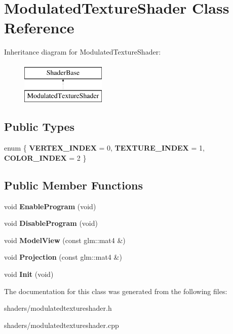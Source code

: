 \hypertarget{classModulatedTextureShader}{\section{\-Modulated\-Texture\-Shader \-Class \-Reference}
\label{classModulatedTextureShader}
}
\-Inheritance diagram for \-Modulated\-Texture\-Shader\-:\begin{figure}[H]
\begin{center}
\leavevmode
\includegraphics[height=2.000000cm]{classModulatedTextureShader}
\end{center}
\end{figure}
\subsection*{\-Public \-Types}
\begin{DoxyCompactItemize}
\item 
enum \{ {\bfseries \-V\-E\-R\-T\-E\-X\-\_\-\-I\-N\-D\-E\-X} =  0, 
{\bfseries \-T\-E\-X\-T\-U\-R\-E\-\_\-\-I\-N\-D\-E\-X} =  1, 
{\bfseries \-C\-O\-L\-O\-R\-\_\-\-I\-N\-D\-E\-X} =  2
 \}
\end{DoxyCompactItemize}
\subsection*{\-Public \-Member \-Functions}
\begin{DoxyCompactItemize}
\item 
\hypertarget{classModulatedTextureShader_a2c28abc3169683267ea6edb812fb86f1}{void {\bfseries \-Enable\-Program} (void)}\label{classModulatedTextureShader_a2c28abc3169683267ea6edb812fb86f1}

\item 
\hypertarget{classModulatedTextureShader_a4013bd45b8dfeb92c422b461aaea55fd}{void {\bfseries \-Disable\-Program} (void)}\label{classModulatedTextureShader_a4013bd45b8dfeb92c422b461aaea55fd}

\item 
\hypertarget{classModulatedTextureShader_ac31c77280c385429860dde8898bf95ea}{void {\bfseries \-Model\-View} (const glm\-::mat4 \&)}\label{classModulatedTextureShader_ac31c77280c385429860dde8898bf95ea}

\item 
\hypertarget{classModulatedTextureShader_a315d7c9ca628120da31f1b418e952888}{void {\bfseries \-Projection} (const glm\-::mat4 \&)}\label{classModulatedTextureShader_a315d7c9ca628120da31f1b418e952888}

\item 
\hypertarget{classModulatedTextureShader_a1f450015891452223c0e7d9da5c79925}{void {\bfseries \-Init} (void)}\label{classModulatedTextureShader_a1f450015891452223c0e7d9da5c79925}

\end{DoxyCompactItemize}


\-The documentation for this class was generated from the following files\-:\begin{DoxyCompactItemize}
\item 
shaders/modulatedtextureshader.\-h\item 
shaders/modulatedtextureshader.\-cpp\end{DoxyCompactItemize}
